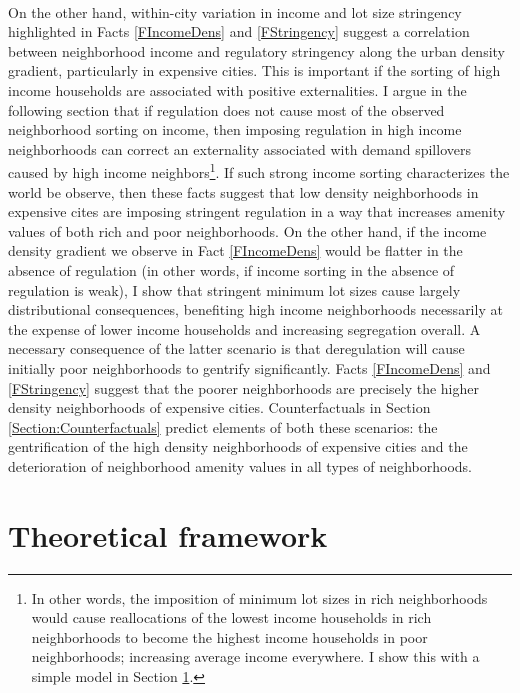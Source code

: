 \documentclass[12pt]{article}
\begin{document}
	\paragraph*{}
	On the other hand, within-city variation in income and lot size stringency highlighted in Facts \ref{FIncomeDens} and \ref{FStringency} suggest a correlation between neighborhood income and regulatory stringency along the urban density gradient, particularly in expensive cities. This is important if the sorting of high income households are associated with positive externalities. I argue in the following section that if regulation does not cause most of the observed neighborhood sorting on income, then imposing regulation in high income neighborhoods can correct an externality associated with demand spillovers caused by high income neighbors\footnote{In other words, the imposition of minimum lot sizes in rich neighborhoods would cause reallocations of the lowest income households in rich neighborhoods to become the highest income households in poor neighborhoods; increasing average income everywhere. I show this with a simple model in Section \ref{Section:Model}.}. If such strong income sorting characterizes the world be observe, then these facts suggest that low density neighborhoods in expensive cites are imposing stringent regulation in a way that increases amenity values of both rich and poor neighborhoods. On the other hand, if the income density gradient we observe in Fact \ref{FIncomeDens} would be flatter in the absence of regulation (in other words, if income sorting in the absence of regulation is weak), I show that stringent minimum lot sizes cause largely distributional consequences, benefiting high income neighborhoods necessarily at the expense of lower income households and increasing segregation overall. A necessary consequence of the latter scenario is that deregulation will cause initially poor neighborhoods to gentrify significantly. Facts \ref{FIncomeDens} and \ref{FStringency} suggest that the poorer neighborhoods are precisely the higher density neighborhoods of expensive cities. Counterfactuals in Section \ref{Section:Counterfactuals} predict elements of both these scenarios: the gentrification of the high density neighborhoods of expensive cities and the deterioration of neighborhood amenity values in all types of neighborhoods.
	
\section{Theoretical framework}\label{Section:Model}
	
\end{document}
